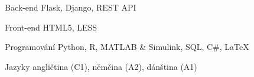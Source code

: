 

\begin{cvskills}


  \cvskill
    {Back-end} %
    {Flask, Django, REST API} %

  \cvskill
    {Front-end} %
    {HTML5, LESS} %

  \cvskill
    {Programování} %
    {Python, R, MATLAB \& Simulink, SQL, C\#, LaTeX} %

  \cvskill
    {Jazyky} %
    {angličtina (C1), němčina (A2), dánština (A1)} %

\end{cvskills}
